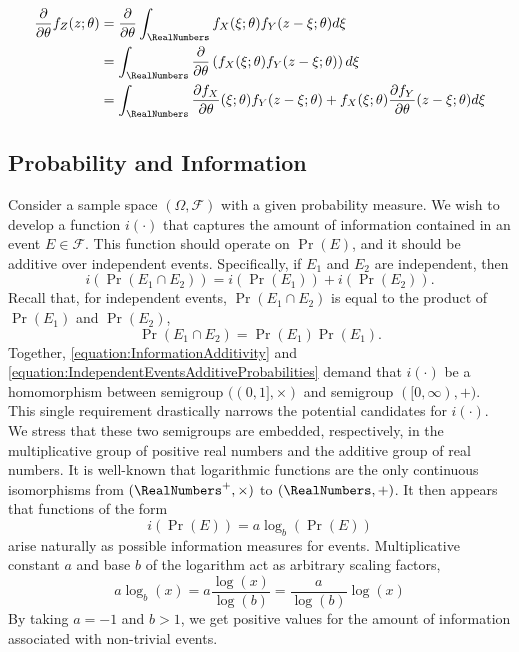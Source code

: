 \begin{equation*}
\begin{split}
\frac{\partial}{\partial \theta} f_Z (z; \theta)
&= \frac{\partial}{\partial \theta} \int_{\RealNumbers} f_X (\xi; \theta) f_Y (z - \xi; \theta) d\xi \\
&= \int_{\RealNumbers} \frac{\partial}{\partial \theta}
\left( f_X (\xi; \theta) f_Y (z - \xi; \theta) \right) d\xi \\
&= \int_{\RealNumbers}
\frac{\partial f_X}{\partial \theta} (\xi; \theta) f_Y (z - \xi; \theta)
+ f_X (\xi; \theta) \frac{\partial f_Y}{\partial \theta} (z - \xi; \theta) d\xi \\
\end{split}
\end{equation*}


\newpage

\subsection{Probability and Information}

Consider a sample space $(\Omega, \mathcal{F})$ with a given probability measure.
We wish to develop a function $i(\cdot)$ that captures the amount of information contained in an event $E \in \mathcal{F}$.
This function should operate on $\Pr(E)$, and it should be additive over independent events.
Specifically, if $E_1$ and $E_2$ are independent, then
\begin{equation} \label{equation:InformationAdditivity}
i \left( \Pr (E_1 \cap E_2) \right)
= i \left( \Pr (E_1) \right) + i \left( \Pr (E_2) \right) .
\end{equation}
Recall that, for independent events, $\Pr(E_1 \cap E_2)$ is equal to the product of $\Pr(E_1)$ and $\Pr(E_2)$,
\begin{equation} \label{equation:IndependentEventsAdditiveProbabilities}
\Pr (E_1 \cap E_2) = \Pr (E_1) \Pr (E_1) .
\end{equation}
Together, \eqref{equation:InformationAdditivity} and \eqref{equation:IndependentEventsAdditiveProbabilities} demand that $i(\cdot)$ be a homomorphism between semigroup $((0,1], \times)$ and semigroup $( [0, \infty), +)$. 
This single requirement drastically narrows the potential candidates for $i(\cdot)$.
We stress that these two semigroups are embedded, respectively, in the multiplicative group of positive real numbers and the additive group of real numbers.
It is well-known that logarithmic functions are the only continuous isomorphisms from $(\RealNumbers^+, \times)$ to $(\RealNumbers, +)$.
It then appears that functions of the form
\begin{equation*}
i \left( \Pr (E) \right) = a \log_b \left( \Pr (E) \right)
\end{equation*}
arise naturally as possible information measures for events.
Multiplicative constant $a$ and base $b$ of the logarithm act as arbitrary scaling factors,
\begin{equation*}
a \log_b ( x ) = a \frac{ \log ( x ) }{ \log ( b) }
= \frac{a}{ \log (b) } \log ( x )
\end{equation*}
By taking $a = -1$ and $b > 1$, we get positive values for the amount of information associated with non-trivial events.

